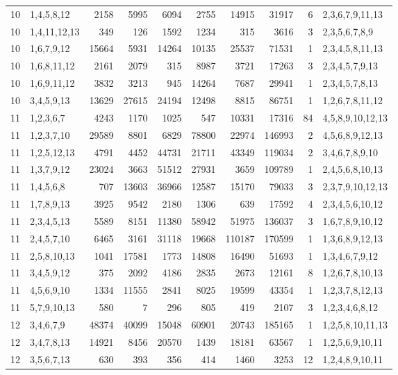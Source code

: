 \begin{table}[tp]
\begin{ruledtabular}
\begin{tabular}{rlrrrrrrrl}
10 & 1,4,5,8,12 & 2158 & 5995 & 6094 & 2755 & 14915 & 31917 & 6 & 2,3,6,7,9,11,13 \\
10 & 1,4,11,12,13 & 349 & 126 & 1592 & 1234 & 315 & 3616 & 3 & 2,3,5,6,7,8,9 \\
10 & 1,6,7,9,12 & 15664 & 5931 & 14264 & 10135 & 25537 & 71531 & 1 & 2,3,4,5,8,11,13 \\
10 & 1,6,8,11,12 & 2161 & 2079 & 315 & 8987 & 3721 & 17263 & 3 & 2,3,4,5,7,9,13 \\
10 & 1,6,9,11,12 & 3832 & 3213 & 945 & 14264 & 7687 & 29941 & 1 & 2,3,4,5,7,8,13 \\
10 & 3,4,5,9,13 & 13629 & 27615 & 24194 & 12498 & 8815 & 86751 & 1 & 1,2,6,7,8,11,12 \\
11 & 1,2,3,6,7 & 4243 & 1170 & 1025 & 547 & 10331 & 17316 & 84 & 4,5,8,9,10,12,13 \\
11 & 1,2,3,7,10 & 29589 & 8801 & 6829 & 78800 & 22974 & 146993 & 2 & 4,5,6,8,9,12,13 \\
11 & 1,2,5,12,13 & 4791 & 4452 & 44731 & 21711 & 43349 & 119034 & 2 & 3,4,6,7,8,9,10 \\
11 & 1,3,7,9,12 & 23024 & 3663 & 51512 & 27931 & 3659 & 109789 & 1 & 2,4,5,6,8,10,13 \\
11 & 1,4,5,6,8 & 707 & 13603 & 36966 & 12587 & 15170 & 79033 & 3 & 2,3,7,9,10,12,13 \\
11 & 1,7,8,9,13 & 3925 & 9542 & 2180 & 1306 & 639 & 17592 & 4 & 2,3,4,5,6,10,12 \\
11 & 2,3,4,5,13 & 5589 & 8151 & 11380 & 58942 & 51975 & 136037 & 3 & 1,6,7,8,9,10,12 \\
11 & 2,4,5,7,10 & 6465 & 3161 & 31118 & 19668 & 110187 & 170599 & 1 & 1,3,6,8,9,12,13 \\
11 & 2,5,8,10,13 & 1041 & 17581 & 1773 & 14808 & 16490 & 51693 & 1 & 1,3,4,6,7,9,12 \\
11 & 3,4,5,9,12 & 375 & 2092 & 4186 & 2835 & 2673 & 12161 & 8 & 1,2,6,7,8,10,13 \\
11 & 4,5,6,9,10 & 1334 & 11555 & 2841 & 8025 & 19599 & 43354 & 1 & 1,2,3,7,8,12,13 \\
11 & 5,7,9,10,13 & 580 & 7 & 296 & 805 & 419 & 2107 & 3 & 1,2,3,4,6,8,12 \\
12 & 3,4,6,7,9 & 48374 & 40099 & 15048 & 60901 & 20743 & 185165 & 1 & 1,2,5,8,10,11,13 \\
12 & 3,4,7,8,13 & 14921 & 8456 & 20570 & 1439 & 18181 & 63567 & 1 & 1,2,5,6,9,10,11 \\
12 & 3,5,6,7,13 & 630 & 393 & 356 & 414 & 1460 & 3253 & 12 & 1,2,4,8,9,10,11 \\

\end{tabular}
\end{ruledtabular}
\end{table}
